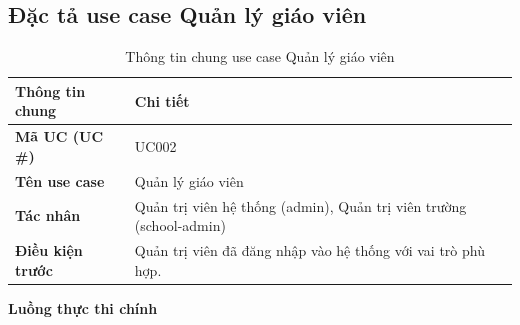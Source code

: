 \subsection{Đặc tả use case Quản lý giáo viên}
\label{subsection:2.3.2}

\begin{table}[htbp]
\centering
\begin{tabular}{|p{4cm}|p{10cm}|}
\hline
\textbf{Thông tin chung} & \textbf{Chi tiết} \\ \hline
\textbf{Mã UC (UC \#)} & UC002 \\ \hline
\textbf{Tên use case} & Quản lý giáo viên \\ \hline
\textbf{Tác nhân} & Quản trị viên hệ thống (admin), Quản trị viên trường (school-admin) \\ \hline
\textbf{Điều kiện trước} & Quản trị viên đã đăng nhập vào hệ thống với vai trò phù hợp. \\ \hline
\end{tabular}
\caption{Thông tin chung use case Quản lý giáo viên}
\label{table:2.3.2_info}
\end{table}

\noindent\textbf{Luồng thực thi chính}

